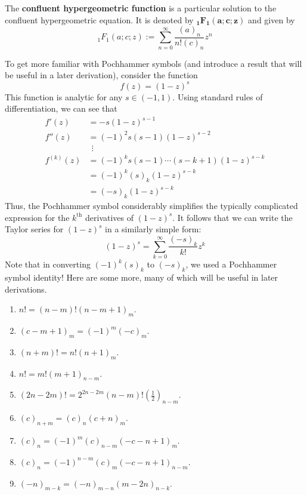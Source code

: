 \documentclass[titlepage]{article}
\numberwithin{equation}{section}
\begin{document}
\begin{definition}
    The \textbf{confluent hypergeometric function} is a particular solution to the confluent hypergeometric equation. It is denoted by $\bm{{}_1F_1(a;c;z)}$ and given by
    \begin{equation*}
        {}_1F_1(a;c;z) := \sum_{n=0}^\infty\frac{(a)_n}{n!(c)_n}z^n
    \end{equation*}
\end{definition}
To get more familiar with Pochhammer symbols (and introduce a result that will be useful in a later derivation), consider the function
\begin{equation*}
    f(z) = (1-z)^s
\end{equation*}
This function is analytic for any $s\in(-1,1)$. Using standard rules of differentiation, we can see that
\begin{align*}
    f'(z) &= -s(1-z)^{s-1}\\
    f''(z) &= (-1)^2s(s-1)(1-z)^{s-2}\\
    &\ \ \vdots\\
    f^{(k)}(z) &= (-1)^ks(s-1)\cdots(s-k+1)(1-z)^{s-k}\\
    &= (-1)^k(s)_k(1-z)^{s-k}\\
    &= (-s)_k(1-z)^{s-k}
\end{align*}
Thus, the Pochhammer symbol considerably simplifies the typically complicated expression for the $k^\text{th}$ derivatives of $(1-z)^s$. It follows that we can write the Taylor series for $(1-z)^s$ in a similarly simple form:
\begin{equation}\label{eqn:1zs}
    (1-z)^s = \sum_{k=0}^\infty\frac{(-s)_k}{k!}z^k
\end{equation}
Note that in converting $(-1)^k(s)_k$ to $(-s)_k$, we used a Pochhammer symbol identity! Here are some more, many of which will be useful in later derivations.
\begin{enumerate}
    \item \label{pci:1}$n!=(n-m)!(n-m+1)_m$.
    \item \label{pci:2}$(c-m+1)_m=(-1)^m(-c)_m$.
    \item \label{pci:3}$(n+m)!=n!(n+1)_m$.
    \item \label{pci:4}$n!=m!(m+1)_{n-m}$.
    \item \label{pci:5}$(2n-2m)!=2^{2n-2m}(n-m)!(\frac{1}{2})_{n-m}$.
    \item \label{pci:6}$(c)_{n+m}=(c)_n(c+n)_m$.
    \item \label{pci:7}$(c)_n=(-1)^m(c)_{n-m}(-c-n+1)_m$.
    \item \label{pci:8}$(c)_n=(-1)^{n-m}(c)_m(-c-n+1)_{n-m}$.
    \item \label{pci:9}$(-n)_{m-k}=(-n)_{m-n}(m-2n)_{n-k}$.
\end{enumerate}
\end{document}

